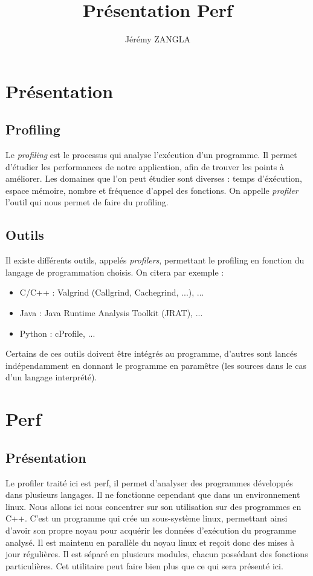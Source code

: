 \documentclass[a4paper, 12pt]{article}
\title{Présentation Perf}
\author{Jérémy ZANGLA}
\begin{document}
\maketitle
\pagebreak
\tableofcontents
\pagebreak
\section{Présentation}
\subsection{Profiling}
    Le \emph{profiling} est le processus qui analyse l'exécution d'un programme.
    Il permet d'étudier les performances de notre application, afin de trouver les points à améliorer.
    Les domaines que l'on peut étudier sont diverses : temps d'éxécution, espace mémoire, nombre et fréquence d'appel des fonctions.
    On appelle \emph{profiler} l'outil qui nous permet de faire du profiling.
\subsection{Outils}
    Il existe différents outils, appelés \emph{profilers}, permettant le profiling en fonction du langage de programmation choisis. On citera par exemple : 
    \begin{itemize}
        \item C/C++ : Valgrind (Callgrind, Cachegrind, ...), ...
        \item Java : Java Runtime Analysis Toolkit (JRAT), ...
        \item Python : cProfile, ...
    \end{itemize}
    Certains de ces outils doivent être intégrés au programme, d'autres sont lancés indépendamment en donnant le programme en paramêtre (les sources dans le cas d'un langage interprété).
\section{Perf}
\subsection{Présentation}Le profiler traité ici est perf, il permet d'analyser des programmes développés dans plusieurs langages. Il ne fonctionne cependant que dans un environnement linux. Nous allons ici nous concentrer sur son utilisation sur des programmes en C++.
    C'est un programme qui crée un sous-système linux, permettant ainsi d'avoir son propre noyau pour acquérir les données d'exécution du programme analysé. Il est maintenu en parallèle du noyau linux et reçoit donc des mises à jour régulières.
    Il est séparé en plusieurs modules, chacun possédant des fonctions particulières. Cet utilitaire peut faire bien plus que ce qui sera présenté ici.
\end{document}
